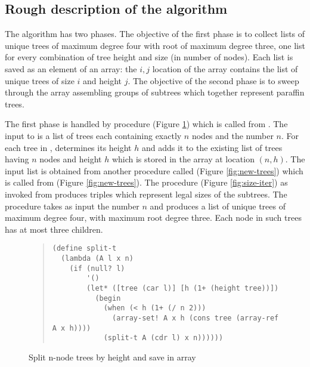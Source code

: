 \subsection{Rough description of the algorithm}

The algorithm has two phases.  The objective of the first phase is to collect
lists of unique trees of maximum degree four with root of maximum degree
three, one list for every combination of tree height and size (in number of
nodes).  Each list is saved as an element of an array: the $i,j$ location of the
array contains the list of unique trees of size $i$ and height $j$.  The
objective of the second phase is to sweep through the array assembling groups
of subtrees which together represent paraffin trees.

The first phase is handled by procedure 
(Figure \ref{fig:split-t}) which is called from .
The input to  is a list  of trees each containing
exactly $n$ nodes
and the number $n$.  For each tree in ,  determines its
height $h$ and
adds it to the existing list of trees having $n$ nodes and height $h$ which is
stored in the array at location $(n,h)$.  The input list  is obtained
from another procedure called  (Figure \ref{fig:new-trees})
which is called from  (Figure \ref{fig:new-trees}).
The procedure  (Figure \ref{fig:size-iter}) as invoked from
 produces triples which represent legal sizes of the
subtrees.  The procedure  takes as input the number $n$ and
produces a list of unique trees of maximum degree four, with maximum root
degree three.  Each node in such trees has at most three children.

\begin{figure}
\begin{frameit}
\begin{quote}
\begin{verbatim}
(define split-t
  (lambda (A l x n)
    (if (null? l)
        '()
        (let* ([tree (car l)] [h (1+ (height tree))])
          (begin
            (when (< h (1+ (/ n 2)))
              (array-set! A x h (cons tree (array-ref A x h))))
            (split-t A (cdr l) x n))))))
\end{verbatim}
\end{quote}
\caption{Split n-node trees by height and save in array}
\label{fig:split-t}
\end{frameit}
\end{figure}


